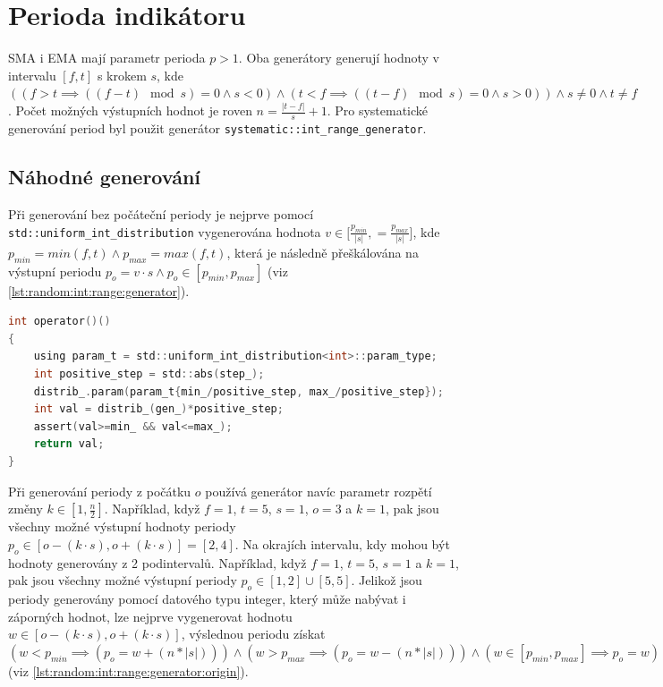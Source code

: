 \section{Perioda indikátoru}
SMA i EMA mají parametr perioda $p>1$.
Oba generátory generují hodnoty v intervalu $[f, t]$ s krokem $s$, kde $((f>t\implies((f-t) \mod s)=0 \land s<0) \land (t<f\implies((t-f) \mod s)=0 \land s>0)) \land s\neq0 \land t\neq f$.
Počet možných výstupních hodnot je roven $n=\frac{|t-f|}{s}+1$.
Pro systematické generování period byl použit generátor \texttt{systematic::int\_range\_generator}.

\subsection{Náhodné generování}
Při generování bez počáteční periody je nejprve pomocí \texttt{std::uniform\_int\_distribution} vygenerována hodnota $ v \in [\frac{p_{min}}{|s|}, = \frac{p_{max}}{|s|}$], kde $p_{min}=min(f, t) \land p_{max}=max(f, t)$, která je následně přeškálována na výstupní periodu $p_o=v\cdot s \land p_o \in [p_{min}, p_{max}]$ (viz \ref{lst:random:int:range:generator}).

\begin{lstlisting}[caption={~Metoda pro náhodné generování periody indikátoru},label={lst:random:int:range:generator},captionpos=t,abovecaptionskip=-\medskipamount,belowcaptionskip=\medskipamount,language=C]
int operator()()
{
    using param_t = std::uniform_int_distribution<int>::param_type;
    int positive_step = std::abs(step_);
    distrib_.param(param_t{min_/positive_step, max_/positive_step});
    int val = distrib_(gen_)*positive_step;
    assert(val>=min_ && val<=max_);
    return val;
}
\end{lstlisting}

Při generování periody z počátku $o$ používá generátor navíc parametr rozpětí změny $k\in[1,\frac{n}{2}]$.
Například, když $f=1$, $t=5$, $s=1$, $o=3$ a $k=1$, pak jsou všechny možné výstupní hodnoty periody $ p_o \in [o-(k\cdot s), o+(k\cdot s)]=[2, 4]$.
Na okrajích intervalu, kdy mohou být hodnoty generovány z 2 podintervalů. Například, když $f=1$, $t=5$, $s=1$ a $k=1$, pak jsou všechny možné výstupní periody $p_o \in [1, 2] \cup [5, 5]$.
Jelikož jsou periody generovány pomocí datového typu integer, který může nabývat i záporných hodnot, lze nejprve vygenerovat hodnotu $ w \in [o-(k\cdot s), o+(k\cdot s)]$, výslednou periodu získat $(w<p_{min}\implies(p_o=w+(n*|s|))) \land (w>p_{max}\implies(p_o=w-(n*|s|))) \land (w \in [p_{min}, p_{max}]\implies p_o=w)$ (viz \ref{lst:random:int:range:generator:origin}).

